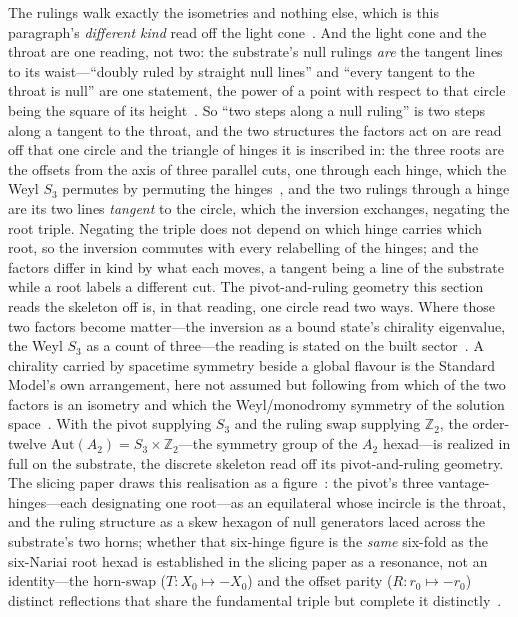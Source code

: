 \documentclass[11pt,a4paper]{article}
\theoremstyle{plain}
\theoremstyle{definition}
\theoremstyle{remark}
\begin{document}
The rulings walk exactly the isometries and nothing else, which is this paragraph's \emph{different kind} read off the light cone~\cite{JanzenSlicing,JanzenGeometricCore}. And the light cone and the throat are one reading, not two: the substrate's null rulings \emph{are} the tangent lines to its waist---``doubly ruled by straight null lines'' and ``every tangent to the throat is null'' are one statement, the power of a point with respect to that circle being the square of its height~\cite{JanzenGeometricCore}. So ``two steps along a null ruling'' is two steps along a tangent to the throat, and the two structures the factors act on are read off that one circle and the triangle of hinges it is inscribed in: the three roots are the offsets from the axis of three parallel cuts, one through each hinge, which the Weyl $S_3$ permutes by permuting the hinges~\cite{JanzenSlicing}, and the two rulings through a hinge are its two lines \emph{tangent} to the circle, which the inversion exchanges, negating the root triple. Negating the triple does not depend on which hinge carries which root, so the inversion commutes with every relabelling of the hinges; and the factors differ in kind by what each moves, a tangent being a line of the substrate while a root labels a different cut. The pivot-and-ruling geometry this section reads the skeleton off is, in that reading, one circle read two ways. Where those two factors become matter---the inversion as a bound state's chirality eigenvalue, the Weyl $S_3$ as a count of three---the reading is stated on the built sector~\cite{JanzenMatter}. A chirality carried by spacetime symmetry beside a global flavour is the Standard Model's own arrangement, here not assumed but following from which of the two factors is an isometry and which the Weyl/monodromy symmetry of the solution space~\cite{JanzenGeometricCore}. With the pivot supplying $S_3$ and the ruling swap supplying $\mathbb{Z}_2$, the order-twelve $\mathrm{Aut}(A_2)=S_3\times\mathbb{Z}_2$---the symmetry group of the $A_2$ hexad---is realized in full on the substrate, the discrete skeleton read off its pivot-and-ruling geometry. The slicing paper draws this realisation as a figure~\cite{JanzenSlicing}: the pivot's three vantage-hinges---each designating one root---as an equilateral whose incircle is the throat, and the ruling structure as a skew hexagon of null generators laced across the substrate's two horns; whether that six-hinge figure is the \emph{same} six-fold as the six-Nariai root hexad is established in the slicing paper as a resonance, not an identity---the horn-swap ($T:X_0\mapsto-X_0$) and the offset parity ($R:r_0\mapsto-r_0$) distinct reflections that share the fundamental triple but complete it distinctly~\cite{JanzenSlicing}.
\end{document}
